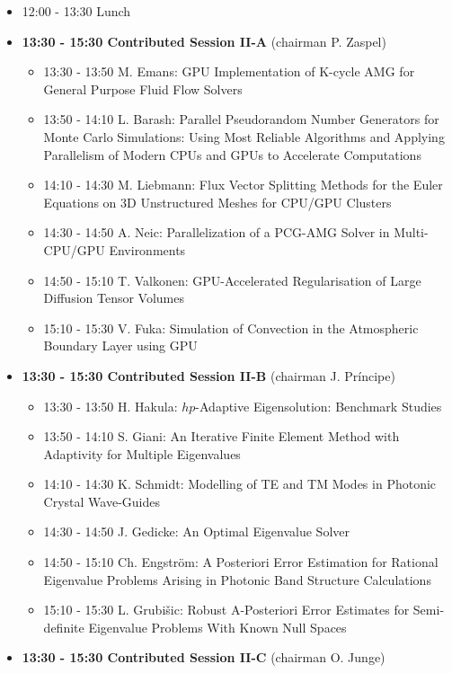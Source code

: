 \documentclass[10pt, A4]{article}%
\begin{document}
\begin{itemize}
\begin{itemize}
  \end{itemize}
  \item 12:00 - 13:30 Lunch
  \item {\bf 13:30 - 15:30 Contributed Session II-A} (chairman P. Zaspel) 
  \begin{itemize}
    \item 13:30 - 13:50 M. Emans: GPU Implementation of K-cycle AMG for General Purpose Fluid Flow Solvers
    \item 13:50 - 14:10 L. Barash: Parallel Pseudorandom Number Generators for Monte Carlo Simulations: Using Most Reliable Algorithms and Applying Parallelism of Modern CPUs and GPUs to Accelerate Computations
    \item 14:10 - 14:30 M. Liebmann: Flux Vector Splitting Methods for the Euler Equations on 3D Unstructured Meshes for CPU/GPU Clusters
    \item 14:30 - 14:50 A. Neic: Parallelization of a PCG-AMG Solver in Multi-CPU/GPU Environments
    \item 14:50 - 15:10 T. Valkonen: GPU-Accelerated Regularisation of Large Diffusion Tensor Volumes
    \item 15:10 - 15:30 V. Fuka: Simulation of Convection in the Atmospheric Boundary Layer using GPU
  \end{itemize}
  \item {\bf 13:30 - 15:30 Contributed Session II-B} (chairman J. Pr\'{i}ncipe) 
  \begin{itemize}
    \item 13:30 - 13:50 H. Hakula: $hp$-Adaptive Eigensolution: Benchmark Studies
    \item 13:50 - 14:10 S. Giani: An Iterative Finite Element Method with Adaptivity for Multiple Eigenvalues
    \item 14:10 - 14:30 K. Schmidt: Modelling of TE and TM Modes in Photonic Crystal Wave-Guides
    \item 14:30 - 14:50 J. Gedicke: An Optimal Eigenvalue Solver
    \item 14:50 - 15:10 Ch. Engstr\"{o}m: A Posteriori Error Estimation for Rational Eigenvalue Problems Arising in Photonic Band Structure Calculations
    \item 15:10 - 15:30 L. Grubi\v{s}ic: Robust A-Posteriori Error Estimates for Semi-definite Eigenvalue Problems With Known Null Spaces
  \end{itemize}
\newpage
    \item {\bf 13:30 - 15:30 Contributed Session II-C} (chairman O. Junge) 
  \begin{itemize}

\end{itemize}
\end{itemize}
\end{document}
